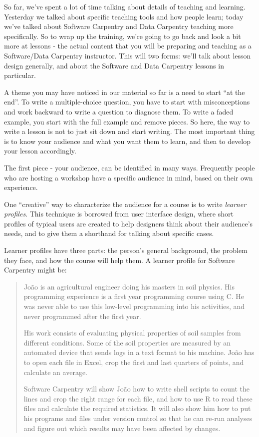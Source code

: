 
So far, we've spent a lot of time talking about details of teaching and
learning.
Yesterday we talked about specific teaching tools and how
people learn; today we've talked about Software Carpentry and Data
Carpentry teaching more specifically.
So to wrap up the training, we're
going to go back and look a bit more at lessons - the actual content
that you will be preparing and teaching as a Software/Data Carpentry
instructor. This will two forms: we'll talk about lesson design
generally, and about the Software and Data Carpentry lessons in
particular.


A theme you may have noticed in our material so far is a need to start
``at the end''. To write a multiple-choice question, you have to start
with
misconceptions and work backward to write a question to diagnose
them. To write a faded example, you start with the full example and
remove pieces. So here, the way to write a lesson is not to just sit
down and start writing. The most important thing is to know your
audience and what you want them to learn, and then to develop your
lesson accordingly.


The first piece - your audience, can be identified in many ways.
Frequently people who are hosting a workshop have a specific audience in
mind, based on their own experience.

One ``creative'' way to characterize the audience for a course is to
write \emph{learner profiles}. This technique is borrowed from user
interface design, where short profiles of typical users are created to
help designers think about their audience's needs, and to give them a
shorthand for talking about specific cases.

Learner profiles have three parts: the person's general background, the
problem they face, and how the course will help them. A learner profile
for Software Carpentry might be:

\begin{quote}
João is an agricultural engineer doing his masters in soil physics. His
programming experience is a first year programming course using C. He
was never able to use this low-level programming into his activities,
and never programmed after the first year.

His work consists of evaluating physical properties of soil samples from
different conditions. Some of the soil properties are measured by an
automated device that sends logs in a text format to his machine. João
has to open each file in Excel, crop the first and last quarters of
points, and calculate an average.

Software Carpentry will show João how to write shell scripts to count
the lines and crop the right range for each file, and how to use R to
read these files and calculate the required statistics. It will also
show him how to put his programs and files under version control so that
he can re-run analyses and figure out which results may have been
affected by changes.
\end{quote}


